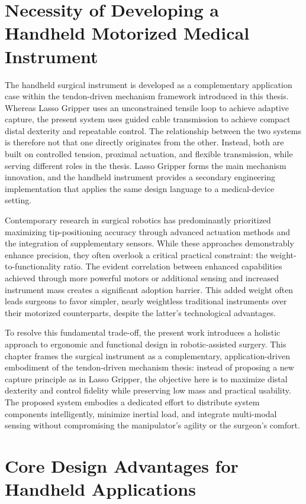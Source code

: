 \section{Necessity of Developing a Handheld Motorized Medical Instrument}
The handheld surgical instrument is developed as a complementary application case within the tendon-driven mechanism framework introduced in this thesis. Whereas Lasso Gripper uses an unconstrained tensile loop to achieve adaptive capture, the present system uses guided cable transmission to achieve compact distal dexterity and repeatable control. The relationship between the two systems is therefore not that one directly originates from the other. Instead, both are built on controlled tension, proximal actuation, and flexible transmission, while serving different roles in the thesis. Lasso Gripper forms the main mechanism innovation, and the handheld instrument provides a secondary engineering implementation that applies the same design language to a medical-device setting.

Contemporary research in surgical robotics has predominantly prioritized maximizing tip-positioning accuracy through advanced actuation methods and the integration of supplementary sensors. While these approaches demonstrably enhance precision, they often overlook a critical practical constraint: the weight-to-functionality ratio. The evident correlation between enhanced capabilities achieved through more powerful motors or additional sensing and increased instrument mass creates a significant adoption barrier. This added weight often leads surgeons to favor simpler, nearly weightless traditional instruments over their motorized counterparts, despite the latter's technological advantages.

To resolve this fundamental trade-off, the present work introduces a holistic approach to ergonomic and functional design in robotic-assisted surgery. This chapter frames the surgical instrument as a complementary, application-driven embodiment of the tendon-driven mechanism thesis: instead of proposing a new capture principle as in Lasso Gripper, the objective here is to maximize distal dexterity and control fidelity while preserving low mass and practical usability. The proposed system embodies a dedicated effort to distribute system components intelligently, minimize inertial load, and integrate multi-modal sensing without compromising the manipulator's agility or the surgeon's comfort.


\section{Core Design Advantages for Handheld Applications}

